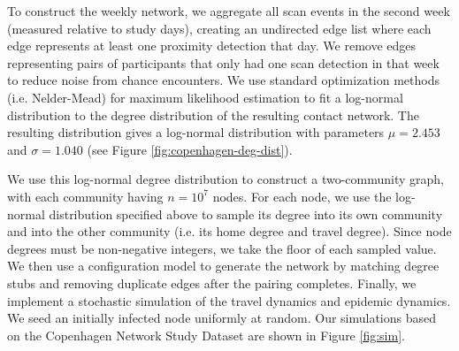 \documentclass[11pt]{article}
\begin{document}
To construct the weekly network, we aggregate all scan events in the second week (measured relative to study days), creating an undirected edge list where each edge represents at least one proximity detection that day. We remove edges representing pairs of participants that only had one scan detection in that week to reduce noise from chance encounters. We use standard optimization methods (i.e. Nelder-Mead) for maximum likelihood estimation to fit a log-normal distribution to the degree distribution of the resulting contact network. The resulting distribution gives a log-normal distribution with parameters $\mu = 2.453$ and $\sigma = 1.040$ (see Figure \ref{fig:copenhagen-deg-dist}).

We use this log-normal degree distribution to construct a two-community graph, with each community having $n = 10^7$ nodes. For each node, we use the log-normal distribution specified above to sample its degree into its own community and into the other community (i.e. its home degree and travel degree). Since node degrees must be non-negative integers, we take the floor of each sampled value. We then use a configuration model to generate the network by matching degree stubs and removing duplicate edges after the pairing completes. Finally, we implement a stochastic simulation of the travel dynamics and epidemic dynamics. We seed an initially infected node uniformly at random. Our simulations based on the Copenhagen Network Study Dataset are shown in Figure \ref{fig:sim}.
\end{document}
